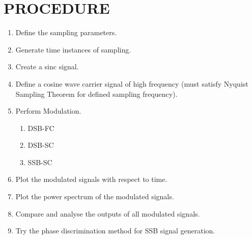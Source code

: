 \newpage
\section*{PROCEDURE}

\begin{enumerate}[label=\arabic*., itemsep=6pt, parsep=0pt, leftmargin=*]
\item Define the sampling parameters.
\item Generate time instances of sampling.
\item Create a sinc signal.
\item Define a cosine wave carrier signal of high frequency (must satisfy Nyquist Sampling
Theorem for defined sampling frequency).
\item Perform Modulation.
\begin{enumerate}
    \item DSB-FC
    \item DSB-SC
    \item SSB-SC
\end{enumerate}
\item Plot the modulated signals with respect to time.
\item Plot the power spectrum of the modulated signals.
\item Compare and analyse the outputs of all modulated signals.
\item Try the phase discrimination method for SSB signal generation.
\end{enumerate}